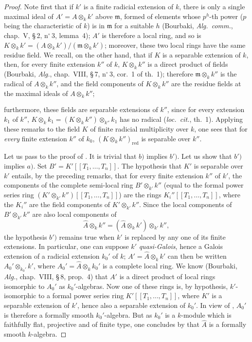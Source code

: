 \begin{proof}
Note first that if $k'$ is a finite radicial extension of $k$, there is only a single maximal ideal of $A'=A\otimes_k k'$ above $\mathfrak{m}$, formed of elements whose $p^h$-th power ($p$ being the characteristic of $k$) is in $\mathfrak{m}$ for a suitable $h$ (Bourbaki, \emph{Alg.\ comm.}, chap.~V, \S\,2, n$^\circ$\,3, lemma~4);
$A'$ is therefore a local ring, and so is
$K\otimes_k k'=(A\otimes_k k')/(\mathfrak{m}\otimes_k k')$; moreover, these two local rings have the same residue field.
We recall, on the other hand, that if $K$ is a separable extension of $k$, then, for every finite extension $k''$ of $k$, $K\otimes_k k''$ is a direct product of fields (Bourbaki, \emph{Alg.}, chap.~VIII, \S\,7, n$^\circ$\,3, cor.~1 of th.~1);
therefore $\mathfrak{m}\otimes_k k''$ is the radical of $A\otimes_k k''$, and the field components of $K\otimes_k k''$ are the residue fields at the maximal ideals of $A\otimes_k k''$;


furthermore, these fields are separable extensions of $k''$, since for every extension $k_1$ of $k''$,
$K\otimes_k k_1=(K\otimes_k k'')\otimes_{k''}k_1$ has no radical (\emph{loc.\ cit.}, th.~1).
Applying these remarks to the field $K$ of finite radicial multiplicity over $k$, one sees that for \emph{every} finite extension $k''$ of $k_0$, $(K\otimes_k k'')_{\mathrm{red}}$ is separable over $k''$.

Let us pass to the proof of .
It is trivial that $b)$ implies $b')$.
Let us show that $b')$ implies $a)$.
Set $B'=K'[[T_1,\ldots,T_n]]$.
The hypothesis that $K'$ is separable over $k'$ entails, by the preceding remarks, that for every finite extension $k''$ of $k'$, the components of the complete semi-local ring
$B'\otimes_{k'}k''$ (equal to the formal power series ring
$(K'\otimes_{k'}k'')[[T_1,\ldots,T_n]]$) are the rings
$K_i''[[T_1,\ldots,T_n]]$, where the $K_i''$ are the field components of
$K'\otimes_{k'}k''$.
Since the local components of $B'\otimes_{k'}k''$ are also local components of
\[
  \widehat{A}\otimes_k k''
  =(\widehat{A}\otimes_k k')\otimes_{k'}k'',
\]
the hypothesis $b')$ remains true when $k'$ is replaced by any one of its finite extensions.
In particular, one can suppose $k'$ \emph{quasi-Galois}, hence a Galois extension of a radicial extension $k_0'$ of $k$;
$A'=\widehat{A}\otimes_k k'$ can then be written
$A_0'\otimes_{k_0'}k'$, where $A_0'=\widehat{A}\otimes_k k_0'$ is a complete local ring.
We know (Bourbaki, \emph{Alg.}, chap.~VIII, \S\,8, prop.~4) that $A'$ is a direct product of local rings isomorphic to $A_0'$ as $k_0'$-algebras.
Now one of these rings is, by hypothesis, $k'$-isomorphic to a formal power series ring
$K'[[T_1,\ldots,T_n]]$, where $K'$ is a separable extension of $k'$, hence also a separable extension of $k_0'$.
In view of , $A_0'$ is therefore a formally smooth $k_0'$-algebra.
But as $k_0'$ is a $k$-module which is faithfully flat, projective and of finite type, one concludes by  that $\widehat{A}$ is a formally smooth $k$-algebra.


\end{proof}
